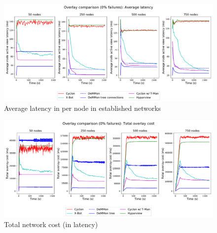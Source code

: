 \begin{figure}
    \centering
    \includegraphics[width=\linewidth]{Chapters/evaluation/figures/membership/membership_lat_over_time_0_failures.pdf}
    \caption{Average latency in per node in established networks}
    \label{fig:overlay_proto_res_net_building:0_failures_lat}
\end{figure}


\begin{figure}
    \centering
    \includegraphics[width=\linewidth]{Chapters/evaluation/figures/membership/membership_total_lat_over_time_0_failures.pdf}
    \caption{Total network cost (in latency)}
    \label{fig:overlay_proto_res_net_building:0_failures_lat_total}
\end{figure}

